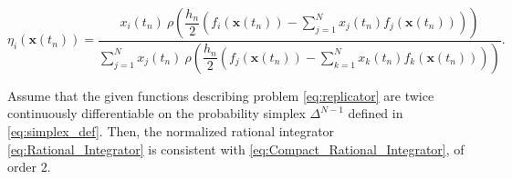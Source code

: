 \documentclass[10pt,a4paper]{amsart}
\begin{document}
\begin{equation}\label{eq:eta}
        \eta_i(\bm{x}(t_n))=\dfrac{x_i(t_{n}) \ \rho \! \left( \! \dfrac{h_n}{2} \! \left( \! f_i(\bm{x}(t_{n})) - \displaystyle \sum_{j=1}^{N} x_j(t_{n}) f_j(\bm{x}(t_{n})) \right) \! \right)}{\displaystyle \sum_{j=1}^{N} x_j(t_{n}) \ \rho \! \left( \! \dfrac{h_n}{2} \! \left( \! f_j(\bm{x}(t_{n})) - \displaystyle\sum_{k=1}^{N} x_k(t_{n}) f_k(\bm{x}(t_{n})) \right) \! \right) }. 
\end{equation}

\begin{theorem}\label{thm:Consistency}
    Assume that the given functions describing problem \eqref{eq:replicator} are twice continuously differentiable on the probability simplex $\Delta^{N-1}$ defined in \eqref{eq:simplex_def}. Then, the normalized rational integrator \eqref{eq:Rational_Integrator} is consistent with \eqref{eq:Compact_Rational_Integrator}, of order $2.$
\end{theorem}
\end{document}
